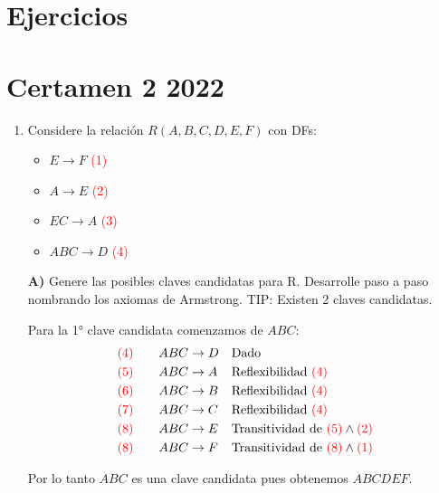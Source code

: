 \documentclass{templateNote}
\begin{document}
\newpage
\section{Ejercicios}

\section*{Certamen 2 2022}

\begin{enumerate}
    \item Considere la relación $R(A,B,C,D,E,F)$ con DFs:
    \begin{itemize}
        \item $E \rightarrow F$ \textcolor{red}{(1)}
        \item $A \rightarrow E$ \textcolor{red}{(2)}
        \item $EC \rightarrow A$ \textcolor{red}{(3)}
        \item $ABC \rightarrow D$ \textcolor{red}{(4)}
    \end{itemize}

    \textbf{A)} Genere las posibles claves candidatas para R. Desarrolle paso a paso nombrando los axiomas de Armstrong. TIP: Existen 2 claves candidatas.

    \hrulefill

    Para la 1° clave candidata comenzamos de $ABC$:
    \begin{align*}
        \textcolor{red}{(4)} \qquad ABC &\rightarrow D && \text{Dado} \\
        \textcolor{red}{(5)} \qquad ABC &\rightarrow A && \text{Reflexibilidad } \textcolor{red}{(4)} \\
        \textcolor{red}{(6)} \qquad ABC &\rightarrow B && \text{Reflexibilidad } \textcolor{red}{(4)} \\
        \textcolor{red}{(7)} \qquad ABC &\rightarrow C && \text{Reflexibilidad } \textcolor{red}{(4)} \\
        \textcolor{red}{(8)} \qquad ABC &\rightarrow E && \text{Transitividad de } \textcolor{red}{(5)} \wedge \textcolor{red}{(2)} \\
        \textcolor{red}{(8)} \qquad ABC &\rightarrow F && \text{Transitividad de } \textcolor{red}{(8)} \wedge \textcolor{red}{(1)} \\
    \end{align*}

    Por lo tanto $ABC$ es una clave candidata pues obtenemos $ABCDEF$.
    

\end{enumerate}
\end{document}
